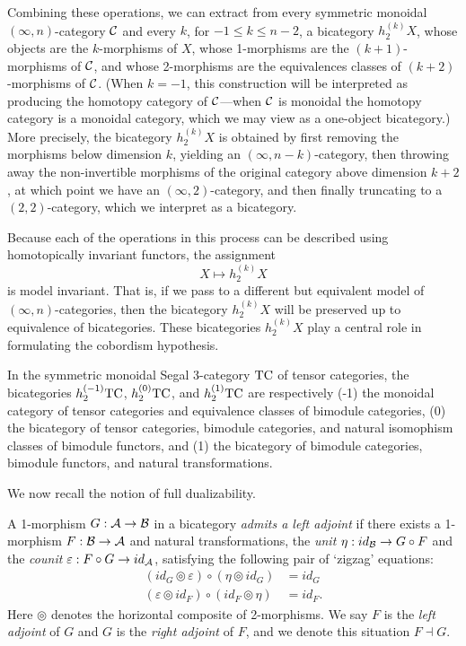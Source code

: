 \documentclass{amsart}
\begin{document}
Combining these operations, we can extract from every symmetric monoidal $(\infty,n)$-category $\mathcal C$ and every $k$, for $-1 \leq k \leq n-2$, a bicategory $h^{(k)}_2 X$, whose objects are the $k$-morphisms of $X$, whose 1-morphisms are the $(k+1)$-morphisms of $\mathcal C$, and whose 2-morphisms are the equivalences classes of $(k+2)$-morphisms of $\mathcal C$. (When $k=-1$, this construction will be interpreted as producing the homotopy category of $\mathcal C$---when $\mathcal C$ is monoidal the homotopy category is a monoidal category, which we may view as a one-object bicategory.)  More precisely, the bicategory $h^{(k)}_2 X$ is obtained by first removing the morphisms below dimension $k$, yielding an $(\infty,n-k)$-category, then throwing away the non-invertible morphisms of the original category above dimension $k+2$, at which point we have an $(\infty,2)$-category, and then finally truncating to a $(2,2)$-category, which we interpret as a bicategory. 

Because each of the operations in this process can be described using homotopically invariant functors, the assignment
\begin{equation*}
	X \mapsto h^{(k)}_2 X
\end{equation*}
is model invariant. That is, if we pass to a different but equivalent model of $(\infty,n)$-categories, then the bicategory  $h^{(k)}_2 X$ will be preserved up to equivalence of bicategories. These bicategories $h^{(k)}_2 X$ play a central role in formulating the cobordism hypothesis.

\begin{example}
	In the symmetric monoidal Segal 3-category $\mathrm{TC}$ of tensor categories, the bicategories $h^{(-1)}_2 \mathrm{TC}$, $h^{(0)}_2 \mathrm{TC}$, and $h^{(1)}_2 \mathrm{TC}$ are respectively (-1) the monoidal category of tensor categories and equivalence classes of bimodule categories, (0) the bicategory of tensor categories, bimodule categories, and natural isomophism classes of bimodule functors, and (1) the bicategory of bimodule categories, bimodule functors, and natural transformations.
\end{example}

We now recall the notion of full dualizability.

\begin{definition} \label{def:adjoints_in_bicat}
		A 1-morphism $G: \mathcal A \to \mathcal B$ in a bicategory {\em admits a left adjoint} if there exists a 1-morphism $F: \mathcal B \to \mathcal A$ and natural transformations, the {\em unit} $\eta: id_{\mathcal B} \to G \circ F$ and the {\em counit} $\varepsilon: F \circ G \to id_{\mathcal A}$, satisfying the following pair of `zigzag' equations:
		\begin{align*}
			(id_{G} \circledcirc \varepsilon  ) \circ (  \eta \circledcirc id_{G}) &= id_{G} \\
			(\varepsilon \circledcirc id_{F}) \circ (id_{F} \circledcirc \eta) &= id_{F}.
		\end{align*}
	Here $\circledcirc$ denotes the horizontal composite of 2-morphisms.
	We say $F$ is the {\em left adjoint} of $G$ and $G$ is the {\em right adjoint} of $F$, and we denote this situation $F \dashv G$.
\end{definition}
\end{document}
